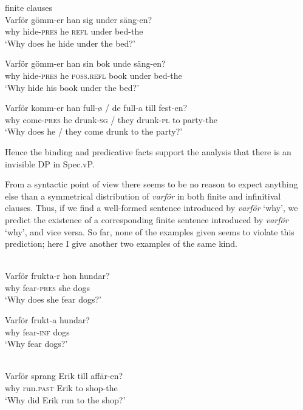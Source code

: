\documentclass[output=paper]{LSP/langsci}
\begin{document}
\ea%
    \label{ex:platzack:25}
	   finite clauses\\
     \ea
\gll Varför   gömm-er  han sig  under     säng-en?\\
        why    hide-\textsc{pres}  he   \textsc{refl}  under    bed-the\\
  \glt   ‘Why does he hide  under the bed?’    

\ex  
\gll Varför   gömm-er               han   sin bok      unde säng-en?\\
        why    hide-\textsc{pres}  he    {\textsc{poss}.\textsc{refl}}   book under   bed-the\\
  \glt   ‘Why hide his book under the bed?'

   \ex
\gll Varför  komm-er   han   full-ø /    de   full-a      till fest-en?\\
        why    come-\textsc{pres}    he drunk-\textsc{sg}  / they   drunk-\textsc{pl}   to  party-the\\
  \glt   ‘Why does he / they come drunk to the party?’
\z
\z


Hence the binding and predicative  facts support the analysis that there is an invisible DP in Spec.vP.

From a syntactic point of view there seems to be no reason to expect anything else than a symmetrical distribution of \textit{varför} in both finite and infinitival clauses. Thus, if we find a well-formed  sentence introduced by \textit{varför} ‘why’, we predict the existence of a corresponding  finite sentence introduced by \textit{varför} ‘why’, and vice versa. So far, none of the  examples given seems to violate this prediction; here I give another two examples of the same kind.

\ea%
    \label{ex:platzack:26}
	  \\

\ea
\gll Varför  frukta-r    hon  hundar? \\
      why    fear-\textsc{pres}  she  dogs\\
\glt   ‘Why does she fear dogs?’

   \ex
\gll Varför  frukt-a  hundar?\\
      why    fear-\textsc{inf}  dogs\\
\glt   ‘Why   fear dogs?’
\z

\z

\ea%
    \label{ex:platzack:27}
	  \\
   \ea
\gll Varför   sprang  Erik  till   affär-en?\\
      why    run.\textsc{past}  Erik  to   shop-the\\
\glt   ‘Why did Erik run to the shop?’
\end{document}
